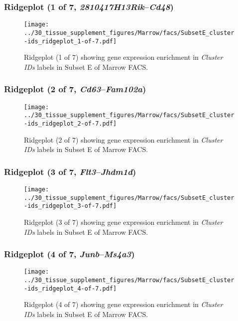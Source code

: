 \clearpage

\subsubsection{Ridgeplot (1 of 7, \emph{2810417H13Rik}--\emph{Cd48})}
\begin{figure}[h]
\centering
\texttt{[image: ../30\_tissue\_supplement\_figures/Marrow/facs/SubsetE\_cluster-ids\_ridgeplot\_1-of-7.pdf]}

\caption{ Ridgeplot (1 of 7)  showing gene expression enrichment in \emph{Cluster IDs} labels in Subset E of Marrow FACS. }
\end{figure}


\clearpage

\subsubsection{Ridgeplot (2 of 7, \emph{Cd63}--\emph{Fam102a})}
\begin{figure}[h]
\centering
\texttt{[image: ../30\_tissue\_supplement\_figures/Marrow/facs/SubsetE\_cluster-ids\_ridgeplot\_2-of-7.pdf]}

\caption{ Ridgeplot (2 of 7)  showing gene expression enrichment in \emph{Cluster IDs} labels in Subset E of Marrow FACS. }
\end{figure}


\clearpage

\subsubsection{Ridgeplot (3 of 7, \emph{Flt3}--\emph{Jhdm1d})}
\begin{figure}[h]
\centering
\texttt{[image: ../30\_tissue\_supplement\_figures/Marrow/facs/SubsetE\_cluster-ids\_ridgeplot\_3-of-7.pdf]}

\caption{ Ridgeplot (3 of 7)  showing gene expression enrichment in \emph{Cluster IDs} labels in Subset E of Marrow FACS. }
\end{figure}


\clearpage

\subsubsection{Ridgeplot (4 of 7, \emph{Junb}--\emph{Ms4a3})}
\begin{figure}[h]
\centering
\texttt{[image: ../30\_tissue\_supplement\_figures/Marrow/facs/SubsetE\_cluster-ids\_ridgeplot\_4-of-7.pdf]}

\caption{ Ridgeplot (4 of 7)  showing gene expression enrichment in \emph{Cluster IDs} labels in Subset E of Marrow FACS. }
\end{figure}


